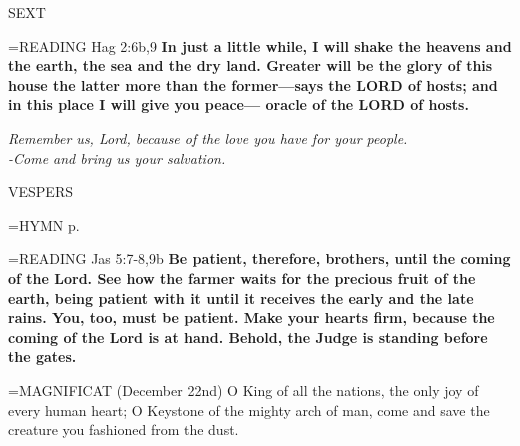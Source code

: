 \begin{flushleft}\normalsize SEXT\\\end{flushleft}

\hangindent=\parindent \small{READING} Hag 2:6b,9 \textbf{In just a little while, I will shake the heavens and the earth, the sea and the dry land. Greater will be the glory of this house the latter more than the former—says the LORD of hosts; and in this place I will give you peace— oracle of the LORD of hosts.}

\begin{center}
\textit{Remember us, Lord, because of the love you have for your people.\\
-Come and bring us your salvation.}
\end{center}

\begin{flushleft}\normalsize VESPERS\\\end{flushleft}

\hangindent=\parindent \small{\uppercase{HYMN} p.  \pageref{advent:firstHymn}\\}

\hangindent=\parindent \small{READING} Jas 5:7-8,9b \textbf{Be patient, therefore, brothers, until the coming of the Lord. See how the farmer waits for the precious fruit of the earth, being patient with it until it receives the early and the late rains. You, too, must be patient. Make your hearts firm, because the coming of the Lord is at hand. Behold, the Judge is standing before the gates.\\}

\hangindent=\parindent \small{MAGNIFICAT  (December 22nd) O King of all the nations, the only joy of every human heart; O Keystone of the mighty arch of man, come and save the creature you fashioned from the dust.\\}
